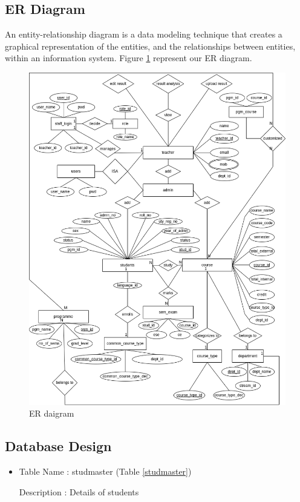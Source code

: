 \documentclass{nascproject}
\begin{document}
\subsection{ER Diagram}
An entity-relationship diagram is a data modeling technique that creates a graphical
representation of the entities, and the relationships between entities, within an information
system. Figure \ref{er} represent our ER diagram.
\begin{figure}
	\centering
	\includegraphics[width=1\linewidth]{er.png}
	\caption{ER daigram}
	\label{er}
\end{figure}
\subsection{Database Design}

\begin{itemize}
	\item Table Name : stud\textunderscore master (Table \ref{studmaster})
	
	Description : Details of students
\end{itemize}
\end{document}
